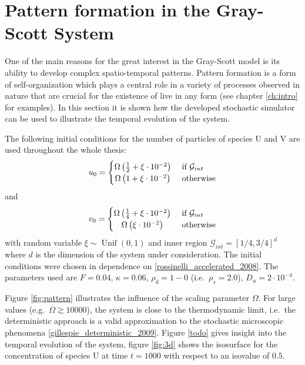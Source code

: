 \section{Pattern formation in the Gray-Scott System}
One of the main reasons for the great interest in the Gray-Scott model is its ability to develop complex spatio-temporal patterns. Pattern formation is a form of self-organization which plays a central role in a variety of processes observed in nature that are crucial for the existence of live in any form (see chapter \ref{ch:intro} for examples). In this section it is shown how the developed stochastic simulator can be used to illustrate the temporal evolution of the system. 

The following initial conditions for the number of particles of species U and V are used throughout the whole thesis:
\begin{align}
 u_0 =
  \begin{cases} 
      \hfill    \Omega \left( \frac{1}{2} + \xi\cdot 10^{-2} \right) \hfill & \text{ if $\mathcal{G}_{int}$} \\
      \hfill \Omega \left( 1 + \xi \cdot 10^{-2} \right) \hfill & \text{ otherwise} \\
  \end{cases}
\end{align}
and
\begin{align}
 v_0 =
  \begin{cases} 
      \hfill    \Omega \left( \frac{1}{4} + \xi\cdot 10^{-2} \right) \hfill & \text{ if $\mathcal{G}_{int}$} \\
      \hfill \Omega \left( \xi \cdot 10^{-2} \right) \hfill & \text{ otherwise} \\
  \end{cases}
\end{align}
with random variable $\xi\! \sim\! \operatorname{Unif}(0,1)$ and inner region $\mathcal{G}_{int} = [1/4, 3/4]^d$ where $d$ is the dimension of the system under consideration. The initial conditions were chosen in dependence on \ref{rossinelli_accelerated_2008}. The parameters used are $F=0.04$, $\kappa = 0.06$, $\rho_d = 1-0$ (i.e.\ $\rho_s = 2.0$), $D_u = 2\cdot 10^{-4}$. 

Figure \ref{fig:pattern} illustrates the influence of the scaling parameter $\Omega$. For large values (e.g.\ $\Omega \gtrsim 10000$), the system is close to the thermodynamic limit, i.e.\ the deterministic approach is a valid approximation to the stochastic microscopic phenomena \ref{gillespie_deterministic_2009}. Figure \ref{todo} gives insight into the temporal evolution of the system, figure \ref{fig:3d} shows the isosurface for the concentration of species U at time $t=1000$ with respect to an isovalue of $0.5$. 

